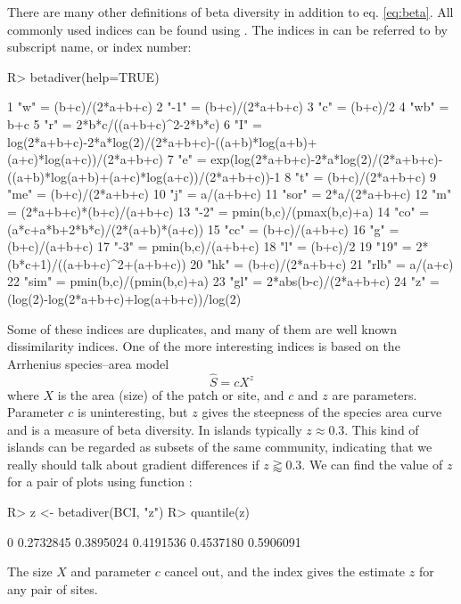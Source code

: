 \documentclass[article,nojss]{jss}
\begin{document}
There are many other definitions of beta diversity in addition to
eq. \ref{eq:beta}.  All commonly used indices can be found using
. The indices in  can be referred
to by subscript name, or index number:
\begin{Schunk}
\begin{Sinput}
R> betadiver(help=TRUE)
\end{Sinput}
\begin{Soutput}
1 "w" = (b+c)/(2*a+b+c)
2 "-1" = (b+c)/(2*a+b+c)
3 "c" = (b+c)/2
4 "wb" = b+c
5 "r" = 2*b*c/((a+b+c)^2-2*b*c)
6 "I" = log(2*a+b+c)-2*a*log(2)/(2*a+b+c)-((a+b)*log(a+b)+(a+c)*log(a+c))/(2*a+b+c)
7 "e" = exp(log(2*a+b+c)-2*a*log(2)/(2*a+b+c)-((a+b)*log(a+b)+(a+c)*log(a+c))/(2*a+b+c))-1
8 "t" = (b+c)/(2*a+b+c)
9 "me" = (b+c)/(2*a+b+c)
10 "j" = a/(a+b+c)
11 "sor" = 2*a/(2*a+b+c)
12 "m" = (2*a+b+c)*(b+c)/(a+b+c)
13 "-2" = pmin(b,c)/(pmax(b,c)+a)
14 "co" = (a*c+a*b+2*b*c)/(2*(a+b)*(a+c))
15 "cc" = (b+c)/(a+b+c)
16 "g" = (b+c)/(a+b+c)
17 "-3" = pmin(b,c)/(a+b+c)
18 "l" = (b+c)/2
19 "19" = 2*(b*c+1)/((a+b+c)^2+(a+b+c))
20 "hk" = (b+c)/(2*a+b+c)
21 "rlb" = a/(a+c)
22 "sim" = pmin(b,c)/(pmin(b,c)+a)
23 "gl" = 2*abs(b-c)/(2*a+b+c)
24 "z" = (log(2)-log(2*a+b+c)+log(a+b+c))/log(2)
\end{Soutput}
\end{Schunk}
Some of these indices are duplicates, and many of them are well known
dissimilarity indices.
One of the more interesting indices is based
on the Arrhenius species--area model
\begin{equation}
  \label{eq:arrhenius}
  \hat S = c X^z
\end{equation}
where $X$ is the area (size) of the patch or site, and $c$ and $z$ are
parameters. Parameter $c$ is uninteresting, but $z$ gives the
steepness of the species area curve and is a measure of beta
diversity. In islands typically  $z \approx 0.3$. This kind of
islands can be regarded as subsets of the same community, indicating
that we really should talk about gradient differences if $z \gtrapprox 0.3$. We
can find the value of $z$ for a pair of plots using function
:
\begin{Schunk}
\begin{Sinput}
R> z <- betadiver(BCI, "z")
R> quantile(z)
\end{Sinput}
\begin{Soutput}
       0%       25%       50%       75%      100% 
0.2732845 0.3895024 0.4191536 0.4537180 0.5906091 
\end{Soutput}
\end{Schunk}
The size $X$ and parameter $c$ cancel out, and the index gives the
estimate $z$ for any pair of sites.
\end{document}
